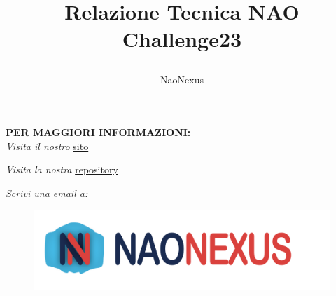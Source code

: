 \documentclass{optica-article}
\begin{document}
\title{ \begin{huge}
\textbf{Relazione Tecnica NAO Challenge23} 
\end{huge} }

\author{\centering NaoNexus}

\bigskip
\noindent
\textbf{PER MAGGIORI INFORMAZIONI:} \\

\noindent\textit{Visita il nostro} \href{https://www.naonexus.altervista.org/naochallenge2023/index.html}{sito}



\noindent \textit{Visita la nostra} \href{https://github.com/NaoNexus/ChallengeNao23}{repository}

\noindent\textit{Scrivi una email a: }

\bigskip

\begin{figure}
    \centering
    \includegraphics[scale=0.05]{figures/logo.png}
    \label{fig:logo_con_scritta}
\end{figure}

\tableofcontents

\vspace{10pt}

\newpage
\end{document}
